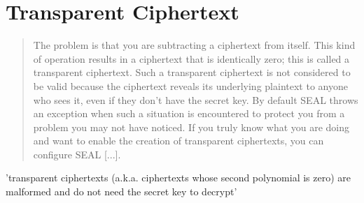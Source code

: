 \section{Transparent Ciphertext}
\begin{quote}
  The problem is that you are subtracting a ciphertext from itself.
  This kind of operation results in a ciphertext that is identically zero;
  this is called a transparent ciphertext. Such a transparent ciphertext
  is not considered to be valid because the ciphertext reveals its underlying plaintext to anyone who sees it,
  even if they don't have the secret key.
  By default SEAL throws an exception when such a situation is encountered to protect you from a problem you may not have noticed.
  If you truly know what you are doing and want to enable the creation of transparent ciphertexts,
  you can configure SEAL [...].
  \parencite{kim-laine-on-transparent-ciphertexts}
\end{quote}

'transparent ciphertexts (a.k.a. ciphertexts whose second polynomial is zero) are malformed and do not need the secret key to decrypt'
